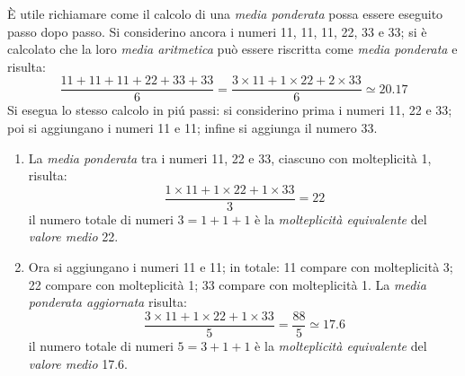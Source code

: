 \documentclass[12pt,a4paper]{article}
\begin{document}
È utile richiamare  come il calcolo di  una \emph{media ponderata} possa essere  eseguito passo dopo
passo.  Si considerino ancora i numeri  \num{11}, \num{11}, \num{11}, \num{22}, \num{33} e \num{33};
si è calcolato che la loro \emph{media  aritmetica} può essere riscritta come \emph{media ponderata}
e risulta:
\begin{equation*}
  \frac{\num{11} + \num{11} + \num{11} + \num{22} + \num{33} + \num{33}}{6}
  = \frac{\num{3} \times{} \num{11}
     + \num{1} \times{} \num{22}
     + \num{2} \times{} \num{33}}
  {6} \simeq \num{20,17}
\end{equation*}
Si  esegua lo  stesso calcolo  in piú  passi: si  considerino prima  i numeri  \num{11}, \num{22}  e
\num{33}; poi si aggiungano i numeri \num{11} e \num{11}; infine si aggiunga il numero \num{33}.
\begin{enumerate}
\item  La  \emph{media  ponderata}  tra  i  numeri  \num{11},  \num{22}  e  \num{33},  ciascuno  con
  molteplicità \num{1}, risulta:
  \begin{equation*}
    \frac{\num{1} \times{} \num{11}
       + \num{1} \times{} \num{22}
       + \num{1} \times{} \num{33}}{\num{3}}
    = \num{22}
  \end{equation*}
  il numero  totale di  numeri \(\num{3}  = \num{1} +  \num{1} +  \num{1}\) è  la \emph{molteplicità
     equivalente} del \emph{valore medio} \num{22}.

\item Ora si aggiungano  i numeri \num{11} e \num{11}; in totale:  \num{11} compare con molteplicità
  \num{3}; \num{22} compare con molteplicità \num{1}; \num{33} compare con molteplicità \num{1}.  La
  \emph{media ponderata aggiornata} risulta:
  \begin{equation*}
    \frac{\num{3} \times{} \num{11}
       + \num{1} \times{} \num{22}
       + \num{1} \times{} \num{33}}{\num{5}}
    = \frac{\num{88}}{\num{5}} \simeq \num{17,6}
  \end{equation*}
  il numero  totale di  numeri \(\num{5}  = \num{3} +  \num{1} +  \num{1}\) è  la \emph{molteplicità
     equivalente} del \emph{valore medio} \num{17,6}.


\end{enumerate}
\end{document}
